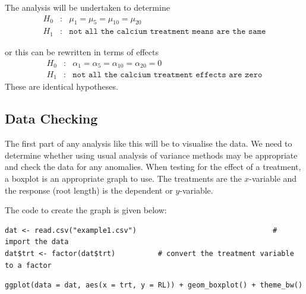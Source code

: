 \documentclass[a4paper, 10pt, fleqn, twosided]{memoir}
\begin{document}
The analysis will be undertaken to determine
\begin{eqnarray*}
	H_0&:& \mu_1 = \mu_5 = \mu_{10} = \mu_{20} \\
	H_1&:& \texttt{not all the calcium treatment means are the same}
\end{eqnarray*}

or this can be rewritten in terms of effects
\begin{eqnarray*}
	H_0&:& \alpha_1 = \alpha_5 = \alpha_{10} = \alpha_{20} = 0 \\
	H_1&:& \texttt{not all the calcium treatment effects are zero}
\end{eqnarray*}
These are identical hypotheses.

\subsection{Data Checking}


The first part of any analysis like this will be to visualise the data. We need to determine whether using usual
analysis of variance methods may be appropriate and check the data for any anomalies. When testing for the effect of a
treatment, a boxplot is an appropriate graph to use. The treatments are the $x$-variable and the response (root length)
is the dependent or $y$-variable.


The code to create the graph is given below:


\begin{tcolorbox}[title = Import and graph the data]
\begin{verbatim}
dat <- read.csv("example1.csv")                                # import the data
dat$trt <- factor(dat$trt)          # convert the treatment variable to a factor
\end{verbatim}
\tcblower
\begin{verbatim}
ggplot(data = dat, aes(x = trt, y = RL)) + geom_boxplot() + theme_bw()
\end{verbatim}
\end{tcolorbox}
\end{document}
